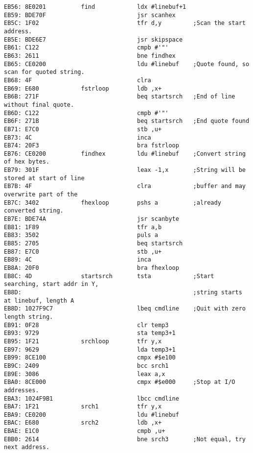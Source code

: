 {\begin{verbatim}
EB56: 8E0201          find            ldx #linebuf+1
EB59: BDE70F                          jsr scanhex
EB5C: 1F02                            tfr d,y         ;Scan the start address.
EB5E: BDE6E7                          jsr skipspace
EB61: C122                            cmpb #'"'
EB63: 2611                            bne findhex
EB65: CE0200                          ldu #linebuf    ;Quote found, so scan for quoted string.
EB68: 4F                              clra
EB69: E680            fstrloop        ldb ,x+
EB6B: 271F                            beq startsrch   ;End of line without final quote.
EB6D: C122                            cmpb #'"'
EB6F: 271B                            beq startsrch   ;End quote found
EB71: E7C0                            stb ,u+
EB73: 4C                              inca
EB74: 20F3                            bra fstrloop                            
EB76: CE0200          findhex         ldu #linebuf    ;Convert string of hex bytes.
EB79: 301F                            leax -1,x       ;String will be stored at start of line
EB7B: 4F                              clra            ;buffer and may overwrite part of the
EB7C: 3402            fhexloop        pshs a          ;already converted string.
EB7E: BDE74A                          jsr scanbyte
EB81: 1F89                            tfr a,b
EB83: 3502                            puls a
EB85: 2705                            beq startsrch   
EB87: E7C0                            stb ,u+
EB89: 4C                              inca
EB8A: 20F0                            bra fhexloop                            
EB8C: 4D              startsrch       tsta            ;Start searching, start addr in Y, 
EB8D:                                                 ;string starts at linebuf, length A
EB8D: 1027F9C7                        lbeq cmdline    ;Quit with zero length string.
EB91: 0F28                            clr temp3
EB93: 9729                            sta temp3+1
EB95: 1F21            srchloop        tfr y,x
EB97: 9629                            lda temp3+1
EB99: 8CE100                          cmpx #$e100
EB9C: 2409                            bcc srch1
EB9E: 3086                            leax a,x
EBA0: 8CE000                          cmpx #$e000     ;Stop at I/O addresses.
EBA3: 1024F9B1                        lbcc cmdline
EBA7: 1F21            srch1           tfr y,x
EBA9: CE0200                          ldu #linebuf
EBAC: E680            srch2           ldb ,x+
EBAE: E1C0                            cmpb ,u+
EBB0: 2614                            bne srch3       ;Not equal, try next address.

\end{verbatim}}
